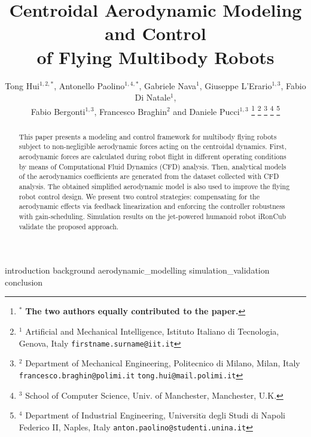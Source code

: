 \documentclass[letterpaper, 10 pt, conference]{ieeeconf}  %
\title{\LARGE \bf
Centroidal Aerodynamic Modeling and Control  \\ of Flying Multibody Robots}
\author{Tong Hui$^{1,2,\textbf{*}}$, Antonello Paolino$^{1,4,\textbf{*}}$, Gabriele Nava$^{1}$, Giuseppe L'Erario$^{1,3}$, Fabio Di Natale$^{1}$,\\ Fabio Bergonti$^{1,3}$, Francesco Braghin$^{2}$ and Daniele Pucci$^{1,3}$
\thanks{$^\textbf{*}$ \textbf{The two authors equally contributed to the paper.}}%
\thanks{$^{1}$ Artificial and Mechanical Intelligence, Istituto Italiano di Tecnologia, Genova, Italy {\tt\small firstname.surname@iit.it}}%
\thanks{$^{2}$ Department of Mechanical Engineering, Politecnico di Milano, Milan, Italy {\tt\small francesco.braghin@polimi.it} {\tt\small tong.hui@mail.polimi.it}}%
\thanks{$^{3}$ School of Computer Science, Univ. of Manchester, Manchester, U.K.}
\thanks{$^{4}$ Department of Industrial Engineering, Universit$\grave{a}$ degli Studi di Napoli Federico II, Naples, Italy {\tt\small anton.paolino@studenti.unina.it}}
}
\begin{document}
\maketitle
\thispagestyle{empty}
\pagestyle{empty}

\begin{abstract}

This paper presents a modeling and control framework for multibody flying robots  subject to non-negligible aerodynamic forces acting on the centroidal dynamics.
First, aerodynamic forces are calculated during robot flight in different operating conditions by means of Computational Fluid Dynamics (CFD) analysis.
Then, analytical models of the aerodynamics coefficients are generated from the dataset collected with CFD analysis. The obtained simplified aerodynamic model is also used to improve the flying robot control design. We present two control strategies: compensating for the aerodynamic effects via feedback linearization and enforcing the controller robustness with gain-scheduling. Simulation results on the jet-powered humanoid robot iRonCub validate the proposed approach.

\end{abstract}


{introduction}
{background}
{aerodynamic_modelling}
{simulation_validation}
{conclusion}




\nocite{*}


\end{document}
